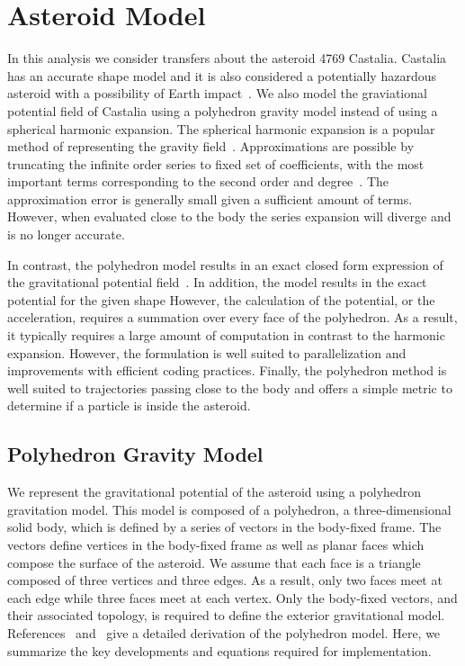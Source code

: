 \documentclass[]{aiaa-tc}%
\begin{document}
\section{Asteroid Model}\label{sec:asteroid_model}

In this analysis we consider transfers about the asteroid 4769 Castalia.
Castalia has an accurate shape model and it is also considered a potentially hazardous asteroid with a possibility of Earth impact~\cite{hudson1994}.
We also model the graviational potential field of Castalia using a polyhedron gravity model instead of using a spherical harmonic expansion.
The spherical harmonic expansion is a popular method of representing the gravity field~\cite{scheeres1996}.
Approximations are possible by truncating the infinite order series to fixed set of coefficients, with the most important terms corresponding to the second order and degree~\cite{scheeres1994}.
The approximation error is generally small given a sufficient amount of terms. 
However, when evaluated close to the body the series expansion will diverge and is no longer accurate. 

In contrast, the polyhedron model results in an exact closed form expression of the gravitational potential field~\cite{werner1994}.
In addition, the model results in the exact potential for the given shape
However, the calculation of the potential, or the acceleration, requires a summation over every face of the polyhedron. 
As a result, it typically requires a large amount of computation in contrast to the harmonic expansion. 
However, the formulation is well suited to parallelization and improvements with efficient coding practices. 
Finally, the polyhedron method is well suited to trajectories passing close to the body and offers a simple metric to determine if a particle is inside the asteroid.

\subsection{Polyhedron Gravity Model}\label{sec:polyhedron_model}

We represent the gravitational potential of the asteroid using a polyhedron gravitation model.
This model is composed of a polyhedron, a three-dimensional solid body, which is defined by a series of vectors in the body-fixed frame.
The vectors define vertices in the body-fixed frame as well as planar faces which compose the surface of the asteroid.
We assume that each face is a triangle composed of three vertices and three edges.
As a result, only two faces meet at each edge while three faces meet at each vertex.
Only the body-fixed vectors, and their associated topology, is required to define the exterior gravitational model.
References~ and~ give a detailed derivation of the polyhedron model.
Here, we summarize the key developments and equations required for implementation.
\end{document}
